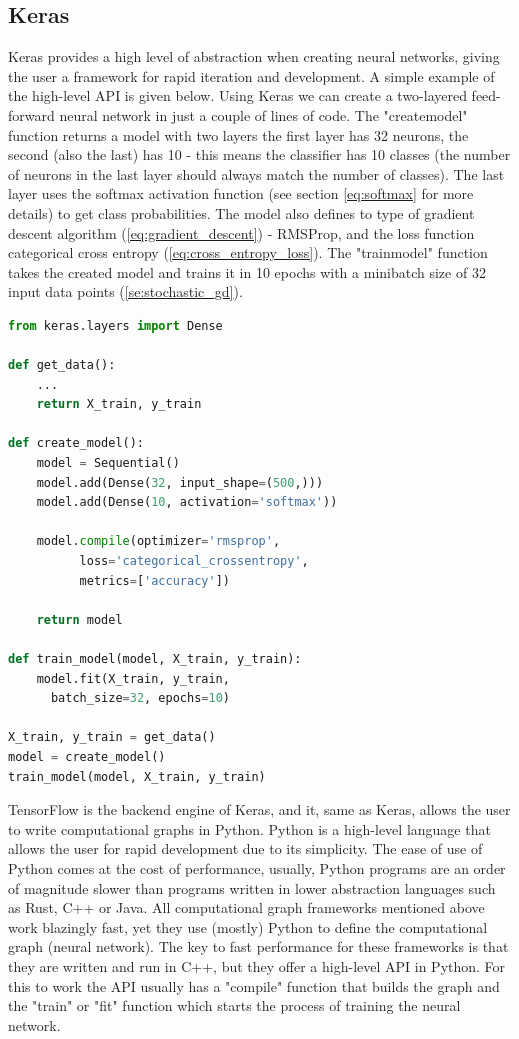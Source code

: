 \documentclass[times, utf8, diplomski]{fer}
\begin{document}
\subsection{Keras}
\label{se:keras}

Keras provides a high level of abstraction when creating neural networks, giving the user a framework for rapid iteration and development. A simple example of the high-level API is given below. Using Keras we can create a two-layered feed-forward neural network in just a couple of lines of code. The "create\textunderscore model" function returns a model with two layers the first layer has 32 neurons, the second (also the last) has 10 - this means the classifier has 10 classes (the number of neurons in the last layer should always match the number of classes). The last layer uses the softmax activation function (see section \ref{eq:softmax} for more details) to get class probabilities. The model also defines to type of gradient descent algorithm (\ref{eq:gradient_descent}) - RMSProp, and the loss function categorical cross entropy (\ref{eq:cross_entropy_loss}). The "train\textunderscore model" function takes the created model and trains it in 10 epochs with a minibatch size of 32 input data points (\ref{se:stochastic_gd}).



\begin{lstlisting}[language=Python, caption=Keras high level API example]
from keras.layers import Dense

def get_data():
    ...
    return X_train, y_train

def create_model():
    model = Sequential()
    model.add(Dense(32, input_shape=(500,)))
    model.add(Dense(10, activation='softmax'))
    
    model.compile(optimizer='rmsprop',
          loss='categorical_crossentropy',
          metrics=['accuracy'])
          
    return model
    
def train_model(model, X_train, y_train):
    model.fit(X_train, y_train,
      batch_size=32, epochs=10)
        
X_train, y_train = get_data()
model = create_model()
train_model(model, X_train, y_train)

\end{lstlisting}

TensorFlow is the backend engine of Keras, and it, same as Keras, allows the user to write computational graphs in Python. Python is a high-level language that allows the user for rapid development due to its simplicity. The ease of use of Python comes at the cost of performance, usually, Python programs are an order of magnitude slower than programs written in lower abstraction languages such as Rust, C++ or Java. All computational graph frameworks mentioned above work blazingly fast, yet they use (mostly) Python to define the computational graph (neural network). The key to fast performance for these frameworks is that they are written and run in C++, but they offer a high-level API in Python. For this to work the API usually has a "compile" function that builds the graph and the "train" or "fit" function which starts the process of training the neural network.
\end{document}
